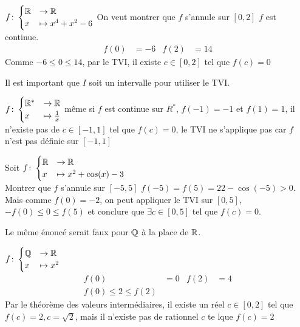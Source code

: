 \begin{exemple}
$
f \colon 
\begin{cases}
\mathbb{R} &\to \mathbb{R} \\
x &\mapsto x^4 + x^2 - 6
\end{cases}
$
On veut montrer que $f$ s'annule sur $[0,2]$ $f$ est continue.
\\
\begin{align*}
f(0) &= -6 & f(2) &= 14
\end{align*}
Comme $-6 \leq 0 \leq 14$, par le TVI, il existe $c \in [0,2]$ tel que $f(c) = 0$
\end{exemple}

\begin{remarque}
Il est important que $I$ soit un intervalle pour utiliser le TVI.
\end{remarque}
\begin{exemple}
$
f \colon 
\begin{cases}
\mathbb{R}^* &\to \mathbb{R} \\
x &\mapsto \frac{1}{x}
\end{cases}
$
même si $f$ est continue sur $R^*$, $f(-1) = -1$ et $f(1) = 1$, il n'existe pas de $c \in [-1, 1]$ tel que $f(c) = 0$, le TVI ne s'applique pas car $f$ n'est pas définie sur $[-1, 1]$
\end{exemple}

\begin{exemple}
Soit 
$
f \colon 
\begin{cases}
\mathbb{R} &\to \mathbb{R} \\
x &\mapsto x^2 + \cos(x) -3
\end{cases}
$ 
\\
Montrer que $f$ s'annule sur $[-5, 5]$ $f(-5) = f(5) = 22 -  \cos(-5) > 0 $. \\
Mais comme $f(0) = -2$, on peut appliquer le TVI sur $[0, 5]$, $-f(0) \leq 0 \leq f(5)$ et conclure que $\exists c \in [0, 5]$ tel que $f(c) = 0$.
\end{exemple}

\begin{remarque}
Le même énoncé serait faux pour $\mathbb{Q}$ à la place de $\mathbb{R}$. 
\end{remarque}

\begin{exemple}
$
f \colon 
\begin{cases}
\mathbb{Q} &\to \mathbb{R} \\
x &\mapsto x^2
\end{cases}
$
\begin{align*}
f(0) &= 0 & f(2) &= 4 \\
f(0) \leq 2 \leq f(2)
\end{align*}
Par le théorème des valeurs intermédiaires, il existe un réel $c \in [0, 2]$ tel que $f(c) = 2, c = \sqrt{2}$, mais il n'existe pas de rationnel $c$ te lque $f(c) = 2$
\end{exemple}